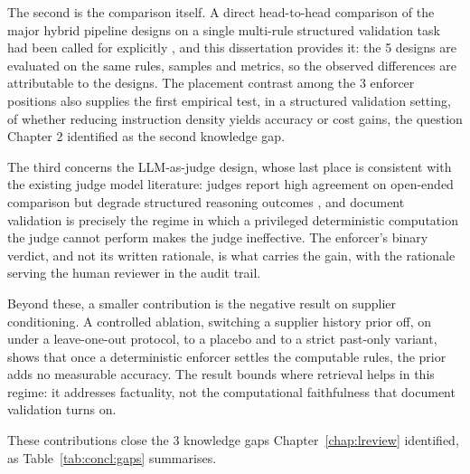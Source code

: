 The second is the comparison itself. A direct head-to-head comparison of the major hybrid pipeline designs on a single multi-rule structured validation task had been called for explicitly \citep{bahroun2026}, and this dissertation provides it: the 5 designs are evaluated on the same rules, samples and metrics, so the observed differences are attributable to the designs. The placement contrast among the 3 enforcer positions also supplies the first empirical test, in a structured validation setting, of whether reducing instruction density yields accuracy or cost gains, the question Chapter 2 identified as the second knowledge gap.

The third concerns the LLM-as-judge design, whose last place is consistent with the existing judge model literature: judges report high agreement on open-ended comparison \citep{zheng2023} but degrade structured reasoning outcomes \citep{stechly2024}, and document validation is precisely the regime in which a privileged deterministic computation the judge cannot perform makes the judge ineffective. The enforcer's binary verdict, and not its written rationale, is what carries the gain, with the rationale serving the human reviewer in the audit trail.

Beyond these, a smaller contribution is the negative result on supplier conditioning. A controlled ablation, switching a supplier history prior off, on under a leave-one-out protocol, to a placebo and to a strict past-only variant, shows that once a deterministic enforcer settles the computable rules, the prior adds no measurable accuracy. The result bounds where retrieval helps in this regime: it addresses factuality, not the computational faithfulness that document validation turns on.

These contributions close the 3 knowledge gaps Chapter~\ref{chap:lreview} identified, as Table~\ref{tab:concl:gaps} summarises.

